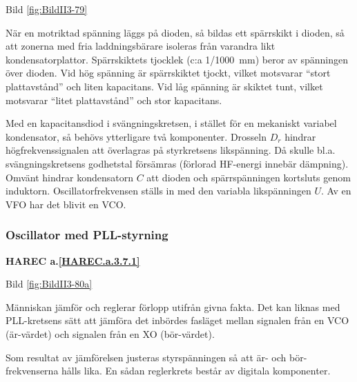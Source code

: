 Bild \ref{fig:BildII3-79}

När en motriktad spänning läggs på dioden, så bildas ett spärrskikt i
dioden, så att zonerna med fria laddningsbärare isoleras från varandra
likt kondensatorplattor. Spärrskiktets tjocklek (c:a 1/1000~mm) beror
av spänningen över dioden. Vid hög spänning är spärrskiktet tjockt,
vilket motsvarar ``stort plattavstånd'' och liten kapacitans. Vid låg
spänning är skiktet tunt, vilket motsvarar ``litet plattavstånd'' och
stor kapacitans.

Med en kapacitansdiod i svängningskretsen, i stället för en mekaniskt
variabel kondensator, så behövs ytterligare två komponenter. Drosseln
\(D_r\) hindrar högfrekvenssignalen att överlagras på styrkretsens
likspänning. Då skulle bl.a. svängningskretsens godhetstal försämras
(förlorad HF-energi innebär dämpning). Omvänt hindrar kondensatorn
\(C\) att dioden och spärrspänningen kortsluts genom
induktorn. Oscillatorfrekvensen ställs in med den variabla
likspänningen \(U\). Av en VFO har det blivit en VCO.

\subsubsection{Oscillator med PLL-styrning}
\textbf{HAREC a.\ref{HAREC.a.3.7.1}\label{myHAREC.a.3.7.1}}

Bild \ref{fig:BildII3-80a}

Människan jämför och reglerar förlopp utifrån givna fakta. Det kan
liknas med PLL-kretsens sätt att jämföra det inbördes fasläget mellan
signalen från en VCO (är-värdet) och signalen från en XO (bör-värdet).

Som resultat av jämförelsen justeras styrspänningen så att är- och
bör-frekvenserna hålls lika. En sådan reglerkrets består av digitala
komponenter.

